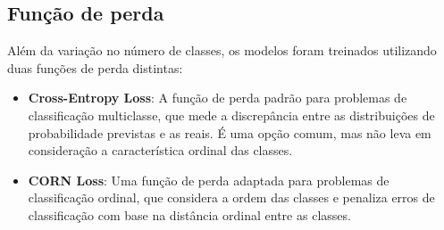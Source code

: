 \subsection{Função de perda}

Além da variação no número de classes, os modelos foram treinados utilizando duas funções de perda distintas:

\begin{itemize}
    \item \textbf{Cross-Entropy Loss}: A função de perda padrão para problemas de classificação multiclasse, que mede a discrepância entre as distribuições de probabilidade previstas e as reais. É uma opção comum, mas não leva em consideração a característica ordinal das classes.
    \item \textbf{CORN Loss}: Uma função de perda adaptada para problemas de classificação ordinal, que considera a ordem das classes e penaliza erros de classificação com base na distância ordinal entre as classes.
\end{itemize}
